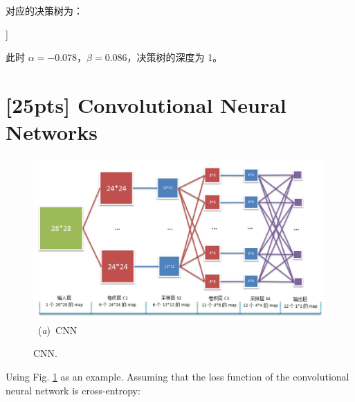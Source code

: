 \documentclass{article}
\begin{document}
	对应的决策树为：
	\begin{center}
		\begin{forest}
		[{$0.078x_1 + 0.086x_2\leq 1?$}, draw
			[{0}, ellipse, draw, edge label={node[midway,left,font=\scriptsize]{是}}]
			[{1}, ellipse, draw, edge label={node[midway,right,font=\scriptsize]{否}}]
		]
		\end{forest}
	\end{center}
	此时 $\alpha = -0.078$，$\beta = 0.086$，决策树的深度为 1。
	\vspace{3cm}
	
	
	\section{[25pts] Convolutional Neural Networks}
    \begin{figure}[h]
    \centering
    \includegraphics[width=120mm]{./framework.jpg}
   \mbox{ \;\;\;\; ({\it a}) {CNN}}
    \caption{CNN.}\label{fig:f1}
    \end{figure}
    
    Using Fig. \ref{fig:f1} as an example. Assuming that the loss function of the convolutional neural network is cross-entropy:
    
\end{document}
